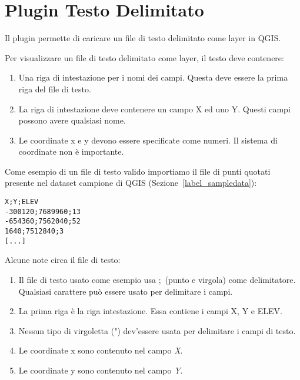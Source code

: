 
\section{Plugin Testo Delimitato}\label{label_dltext}    


Il plugin permette di caricare un file di testo delimitato come layer in QGIS.


Per visualizzare un file di testo delimitato come layer, il testo deve contenere:

\begin{enumerate}
\item Una riga di intestazione per i nomi dei campi. Questa deve essere la prima riga del file di testo.
\item La riga di intestazione deve contenere un campo X ed uno Y. Questi campi possono avere qualsiasi nome.
\item Le coordinate x e y devono essere specificate come numeri. Il sistema di coordinate non è importante.
\end{enumerate}

Come esempio di un file di testo valido importiamo il file di punti quotati  presente 
nel dataset campione di QGIS (Sezione~\ref{label_sampledata}):

\begin{verbatim} 
X;Y;ELEV
-300120;7689960;13
-654360;7562040;52
1640;7512840;3
[...]
\end{verbatim}

Alcune note circa il file di testo:

\begin{enumerate}
\item Il file di testo usato come esempio usa \mbox{$;$} (punto e virgola) come delimitatore. Qualsiasi carattere può 
essere usato per delimitare i campi.
\item La prima riga è la riga intestazione. Essa contiene i campi X, Y e ELEV.
\item Nessun tipo di virgoletta (") dev'essere usata per delimitare i campi di testo.
\item Le coordinate x sono contenuto nel campo {\em X}.
\item Le coordinate y sono contenuto nel campo {\em Y}.
\end{enumerate}

